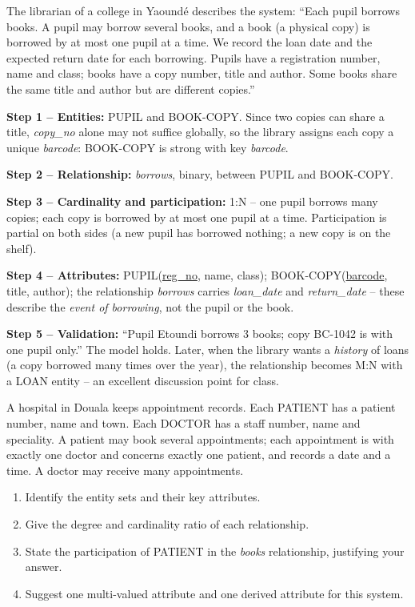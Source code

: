 \documentclass[11pt]{article}
\newcounter{popsec}
\newcounter{popsub}
\newcommand{\courssub}[1]{%
  \stepcounter{popsub}%
  \par\vspace{9pt}\noindent{\popxbold\fontsize{11.5}{13}\selectfont\color{popink}{\color{poporange}\thepopsec.\thepopsub}\hspace{6pt}#1}\par\nopagebreak\vspace{4pt}
}
\begin{document}
\courssub{Case Study: A School Library System}

\begin{experience}
The librarian of a college in Yaound\'e describes the system: ``Each pupil borrows books. A pupil may borrow several books, and a book (a physical copy) is borrowed by at most one pupil at a time. We record the loan date and the expected return date for each borrowing. Pupils have a registration number, name and class; books have a copy number, title and author. Some books share the same title and author but are different copies.''

\textbf{Step 1 -- Entities:} PUPIL and BOOK-COPY. Since two copies can share a title, \emph{copy\_no} alone may not suffice globally, so the library assigns each copy a unique \emph{barcode}: BOOK-COPY is strong with key \emph{barcode}.

\textbf{Step 2 -- Relationship:} \emph{borrows}, binary, between PUPIL and BOOK-COPY.

\textbf{Step 3 -- Cardinality and participation:} 1:N -- one pupil borrows many copies; each copy is borrowed by at most one pupil at a time. Participation is partial on both sides (a new pupil has borrowed nothing; a new copy is on the shelf).

\textbf{Step 4 -- Attributes:} PUPIL(\underline{reg\_no}, name, class); BOOK-COPY(\underline{barcode}, title, author); the relationship \emph{borrows} carries \emph{loan\_date} and \emph{return\_date} -- these describe the \emph{event of borrowing}, not the pupil or the book.

\textbf{Step 5 -- Validation:} ``Pupil Etoundi borrows 3 books; copy BC-1042 is with one pupil only.'' The model holds. Later, when the library wants a \emph{history} of loans (a copy borrowed many times over the year), the relationship becomes M:N with a LOAN entity -- an excellent discussion point for class.
\end{experience}

\begin{exercice}
A hospital in Douala keeps appointment records. Each PATIENT has a patient number, name and town. Each DOCTOR has a staff number, name and speciality. A patient may book several appointments; each appointment is with exactly one doctor and concerns exactly one patient, and records a date and a time. A doctor may receive many appointments.
\begin{enumerate}
\item Identify the entity sets and their key attributes.
\item Give the degree and cardinality ratio of each relationship.
\item State the participation of PATIENT in the \emph{books} relationship, justifying your answer.
\item Suggest one multi-valued attribute and one derived attribute for this system.
\end{enumerate}
\end{exercice}
\end{document}
